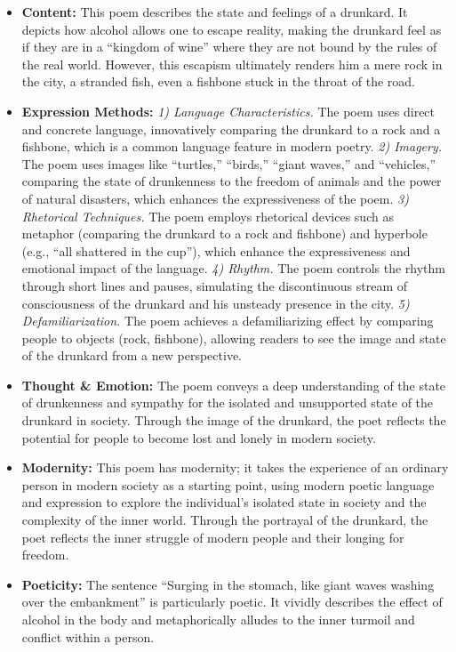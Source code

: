 \documentclass[11pt]{article}
\begin{document}
\begin{itemize}

\item \textbf{Content:}  
This poem describes the state and feelings of a drunkard. It depicts how alcohol allows one to escape reality, making the drunkard feel as if they are in a ``kingdom of wine'' where they are not bound by the rules of the real world. However, this escapism ultimately renders him a mere rock in the city, a stranded fish, even a fishbone stuck in the throat of the road.

\item \textbf{Expression Methods:}
\textit{1) Language Characteristics.} The poem uses direct and concrete language, innovatively comparing the drunkard to a rock and a fishbone, which is a common language feature in modern poetry.
\textit{2) Imagery.} The poem uses images like ``turtles,'' ``birds,'' ``giant waves,'' and ``vehicles,'' comparing the state of drunkenness to the freedom of animals and the power of natural disasters, which enhances the expressiveness of the poem.
\textit{3) Rhetorical Techniques.} The poem employs rhetorical devices such as metaphor (comparing the drunkard to a rock and fishbone) and hyperbole (e.g., ``all shattered in the cup''), which enhance the expressiveness and emotional impact of the language.
\textit{4) Rhythm.} The poem controls the rhythm through short lines and pauses, simulating the discontinuous stream of consciousness of the drunkard and his unsteady presence in the city.
\textit{5) Defamiliarization.} The poem achieves a defamiliarizing effect by comparing people to objects (rock, fishbone), allowing readers to see the image and state of the drunkard from a new perspective.

\item \textbf{Thought \& Emotion:}
The poem conveys a deep understanding of the state of drunkenness and sympathy for the isolated and unsupported state of the drunkard in society. Through the image of the drunkard, the poet reflects the potential for people to become lost and lonely in modern society.

\item \textbf{Modernity:}
This poem has modernity; it takes the experience of an ordinary person in modern society as a starting point, using modern poetic language and expression to explore the individual's isolated state in society and the complexity of the inner world. Through the portrayal of the drunkard, the poet reflects the inner struggle of modern people and their longing for freedom.

\item \textbf{Poeticity:}
The sentence ``Surging in the stomach, like giant waves washing over the embankment'' is particularly poetic. It vividly describes the effect of alcohol in the body and metaphorically alludes to the inner turmoil and conflict within a person.


\end{itemize}
\end{document}
